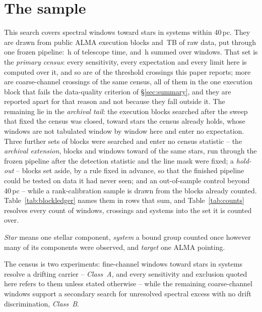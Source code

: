 \section{The sample}
\label{sec:sample}

This search covers \NWindows{} spectral windows toward \NStars{} stars in
\NSystems{} systems within 40\,pc. They are drawn from \NEB{} public ALMA
execution blocks and \TotalDataTB\,TB of raw data, put through one frozen
pipeline: \StTelHours\,h of telescope time, and \LdgCensusHours\,h summed
over windows. That set is the \emph{primary census}: every
sensitivity, every expectation and every limit here is computed over it, and
so are \MtCrossACen{} of the \EvNCrossRaw{} threshold crossings this paper
reports; \LdgNCrossB{} more are coarse-channel crossings of the same census,
all of them in the one execution block that fails the data-quality criterion
of \S\ref{sec:summary}, and they are reported apart for that reason and not
because they fall outside it. The remaining \CeNTailCross{} lie in the
\emph{archival tail}: the \LdgExtTail{} execution blocks searched after the
sweep that fixed the census was closed, toward stars the census already holds,
whose \LdgExtTailWin{} windows are not tabulated window by window here and
enter no expectation. Three further sets of blocks were searched and enter no
census statistic -- the \emph{archival extension}, \LdgExtEB{} blocks and
\LdgExtWin{} windows toward \LdgExtStars{} of the same stars, run through the
frozen pipeline after the detection statistic and the line mask were fixed; a
\emph{hold-out} -- blocks set aside, by a rule fixed in advance, so that the
finished pipeline could be tested on data it had never seen;
and an out-of-sample control beyond 40\,pc -- while a rank-calibration sample
is drawn from the blocks already counted.
Table~\ref{tab:blockledger} names them in rows that sum, and
Table~\ref{tab:counts} resolves every count of windows, crossings and systems
into the set it is counted over.

\emph{Star} means one stellar component, \emph{system} a bound group
counted once however many of its components were observed, and \emph{target}
one ALMA pointing.

The census is two experiments: \NWinA{} fine-channel windows toward
\LdgClassAStars{} stars in \NSysClassA{} systems resolve a drifting carrier
-- \emph{Class~A}, and every sensitivity and exclusion quoted here refers to
them unless stated otherwise -- while the remaining \NWinB{} coarse-channel
windows support a secondary search for unresolved spectral excess with no
drift discrimination, \emph{Class~B}.


